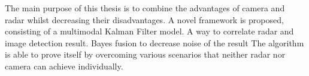 The main purpose of this thesis is to combine the advantages of camera and radar whilst decreasing their disadvantages.
A novel framework is proposed, consisting of a multimodal Kalman Filter model. 
A way to correlate radar and image detection result.
Bayes fusion to decrease noise of the result
The algorithm is able to prove itself by overcoming various scenarios that neither radar nor camera can achieve individually.

